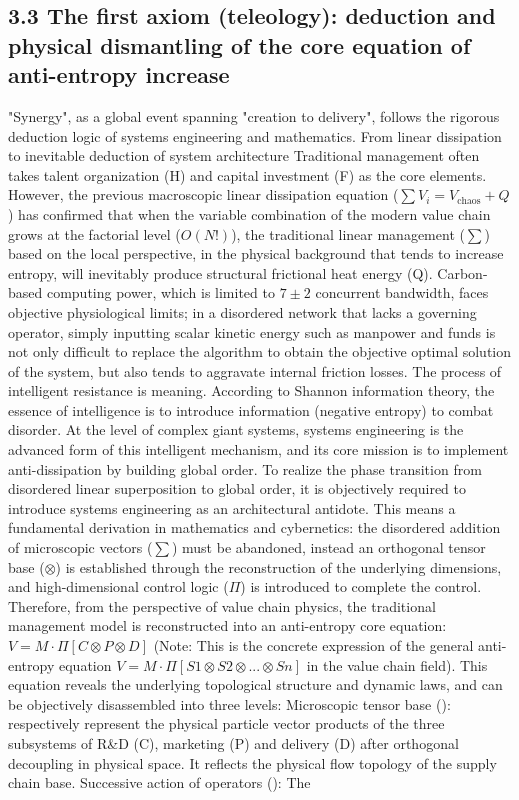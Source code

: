 \documentclass[11pt,a4paper]{article}
\begin{document}
\subsection*{3.3 The first axiom (teleology): deduction and physical dismantling of the core equation of anti-entropy increase}


"Synergy", as a global event spanning "creation to delivery", follows the rigorous deduction logic of systems engineering and mathematics. From linear dissipation to inevitable deduction of system architecture Traditional management often takes talent organization (H) and capital investment (F) as the core elements. However, the previous macroscopic linear dissipation equation ($\sum V_i = V_{\text{chaos}} + Q$) has confirmed that when the variable combination of the modern value chain grows at the factorial level ($O(N!)$), the traditional linear management ($\sum$) based on the local perspective, in the physical background that tends to increase entropy, will inevitably produce structural frictional heat energy (Q). Carbon-based computing power, which is limited to $7 \pm 2$ concurrent bandwidth, faces objective physiological limits; in a disordered network that lacks a governing operator, simply inputting scalar kinetic energy such as manpower and funds is not only difficult to replace the algorithm to obtain the objective optimal solution of the system, but also tends to aggravate internal friction losses. The process of intelligent resistance is meaning. According to Shannon information theory, the essence of intelligence is to introduce information (negative entropy) to combat disorder. At the level of complex giant systems, systems engineering is the advanced form of this intelligent mechanism, and its core mission is to implement anti-dissipation by building global order. To realize the phase transition from disordered linear superposition to global order, it is objectively required to introduce systems engineering as an architectural antidote. This means a fundamental derivation in mathematics and cybernetics: the disordered addition of microscopic vectors ($\sum$) must be abandoned, instead an orthogonal tensor base ($\otimes$) is established through the reconstruction of the underlying dimensions, and high-dimensional control logic ($\Pi$) is introduced to complete the control. Therefore, from the perspective of value chain physics, the traditional management model is reconstructed into an anti-entropy core equation: $V = M \cdot \Pi [ C \otimes P \otimes D  ]$ (Note: This is the concrete expression of the general anti-entropy equation $V = M \cdot \Pi [ S1 \otimes S2 \otimes ... \otimes Sn  ]$ in the value chain field). This equation reveals the underlying topological structure and dynamic laws, and can be objectively disassembled into three levels: Microscopic tensor base (): respectively represent the physical particle vector products of the three subsystems of R\&D (C), marketing (P) and delivery (D) after orthogonal decoupling in physical space. It reflects the physical flow topology of the supply chain base. Successive action of operators (): The 
\end{document}
